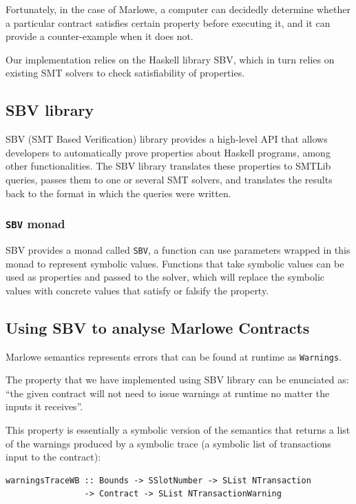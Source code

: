 \documentclass[runningheads]{llncs}
\begin{document}
Fortunately, in the case of Marlowe, a computer can decidedly determine whether a particular contract satisfies certain property before executing it, and it can provide a counter-example when it does not.

Our implementation relies on the Haskell library SBV, which in turn relies on existing SMT solvers to check satisfiability of properties.

\subsection{SBV library}

SBV \cite{SBV} (SMT Based Verification) library provides a high-level API that allows developers to automatically prove properties about Haskell programs, among other functionalities.
The SBV library translates these properties to SMTLib queries, passes them to one or several SMT solvers, and translates the results back to the format in which the queries were written.

\subsubsection{\texttt{SBV} monad}

SBV provides a monad called \texttt{SBV}, a function can use parameters wrapped in this monad to represent symbolic values. Functions that take symbolic values can be used as properties and passed to the solver, which will replace the symbolic values with concrete values that satisfy or falsify the property.

\subsection{Using SBV to analyse Marlowe Contracts}

Marlowe semantics represents errors that can be found at runtime as \texttt{Warnings}.

The property that we have implemented using SBV library can be enunciated as: ``the given contract will not need to issue warnings at runtime no matter the inputs it receives''.

This property is essentially a symbolic version of the semantics that returns a list of the warnings produced by a symbolic trace (a symbolic list of transactions input to the contract):

\begin{verbatim}
warningsTraceWB :: Bounds -> SSlotNumber -> SList NTransaction
                -> Contract -> SList NTransactionWarning
\end{verbatim}
\end{document}
